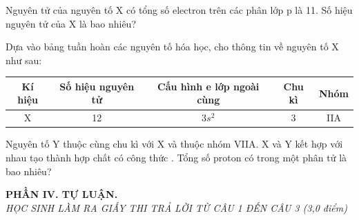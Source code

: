 \documentclass[11pt,a4paper]{article}
\begin{document}
\begin{ex}
Nguyên tử của nguyên tố X có tổng số electron trên các phân lớp p là 11. Số hiệu nguyên tử của X là bao nhiêu?
\end{ex}

\begin{ex}
Dựa vào bảng tuần hoàn các nguyên tố hóa học, cho thông tin về nguyên tố X như sau:
\begin{center}
\begin{tabular}{|c|c|c|c|c|}
\hline
\textbf{Kí hiệu} & \textbf{Số hiệu nguyên tử} & \textbf{Cấu hình e lớp ngoài cùng} & \textbf{Chu kì} & \textbf{Nhóm} \\
\hline
X & 12 & $3s^2$ & 3 & IIA \\
\hline
\end{tabular}
\end{center}
Nguyên tố Y thuộc cùng chu kì với X và thuộc nhóm VIIA. X và Y kết hợp với nhau tạo thành hợp chất có công thức . Tổng số proton có trong một phân tử  là bao nhiêu?
\end{ex}

\vspace{5pt}
\noindent
\textbf{\color{mainGreen}PHẦN IV. TỰ LUẬN.}\\
\textit{HỌC SINH LÀM RA GIẤY THI TRẢ LỜI TỪ CÂU 1 ĐẾN CÂU 3 (3,0 điểm)}
\end{document}
